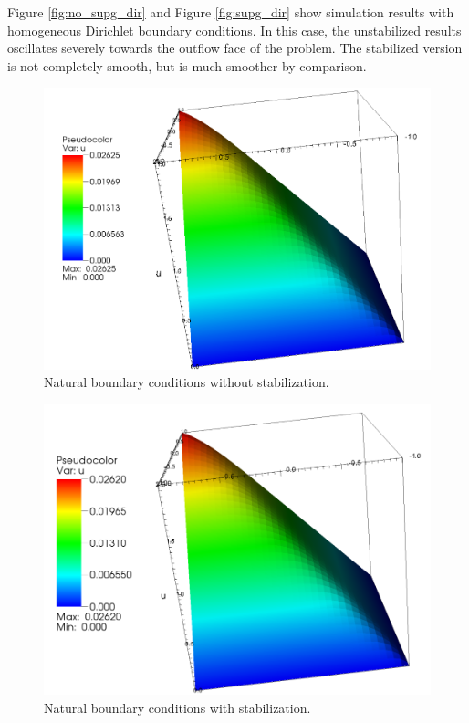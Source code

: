 \documentclass[11pt]{article}
\begin{document}
Figure \ref{fig:no_supg_dir} and Figure \ref{fig:supg_dir} show simulation results with homogeneous Dirichlet boundary conditions. In this case, the unstabilized results oscillates severely towards the outflow face of the problem. The stabilized version is not completely smooth, but is much smoother by comparison.  


\begin{figure}[ht]
	\centering
	\includegraphics[scale=0.3]{./figures/no_supg_natural.png}
	\caption{Natural boundary conditions without stabilization.}
	\label{fig:no_supg_natural}
\end{figure}

\begin{figure}[ht]
	\centering
	\includegraphics[scale=0.3]{./figures/supg_natural.png}
	\caption{Natural boundary conditions with stabilization.}
	\label{fig:supg_natural}
\end{figure}
\end{document}
